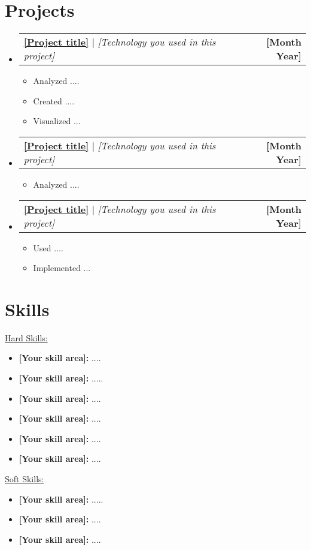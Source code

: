 \documentclass[letterpaper,11pt]{article}
\makeatletter
\newcommand{\resumeItem}[1]{
  \item\small{
    {#1 \vspace{-2pt}}
  }
}
\newcommand{\resumeProjectHeading}[2]{
    \item
    \begin{tabular*}{1.001\textwidth}{l@{\extracolsep{\fill}}r}
      \small#1 & \textbf{\small #2}\\
    \end{tabular*}\vspace{-7pt}
}
\newcommand{\resumeSubHeadingListStart}{\begin{itemize}[leftmargin=0.0in, label={}]}
\newcommand{\resumeSubHeadingListEnd}{\end{itemize}}
\newcommand{\resumeItemListStart}{\begin{itemize}}
\newcommand{\resumeItemListEnd}{\end{itemize}\vspace{-5pt}}
\makeatother
\begin{document}
\section{Projects}
    \vspace{-5pt}
    \resumeSubHeadingListStart
      \resumeProjectHeading
          {\href{[Github link, about your project]}{\textbf{[Project title]}} $|$ \emph{[Technology you used in this project]}}{[Month Year]}
          \resumeItemListStart
            \resumeItem{Analyzed ....}
            \resumeItem{Created ....}
            \resumeItem{Visualized ...}
          \resumeItemListEnd
          \vspace{-13pt}
      \resumeProjectHeading
          {\href{[Github link, about your project]}{\textbf{[Project title]}} $|$ \emph{[Technology you used in this project]}}{[Month Year]}
          \resumeItemListStart
            \resumeItem{Analyzed ....}
          \resumeItemListEnd 
          \vspace{-13pt}
          \resumeProjectHeading
          {\href{[Github link, about your project]}{\textbf{[Project title]}} $|$ \emph{[Technology you used in this project]}}{[Month Year]}
          \resumeItemListStart
            \resumeItem{Used ....}
            \resumeItem{Implemented ...}
          \resumeItemListEnd 
    \resumeSubHeadingListEnd
\vspace{-15pt}

\section{Skills}
 \begin{itemize}[leftmargin=0.01in, label={}]
    \small{\item{
     \underline{Hard Skills:}
        \resumeItemListStart
            \resumeItem{\textbf{[Your skill area]:} ....}
            \resumeItem{\textbf{[Your skill area]:} .....}
            \resumeItem{\textbf{[Your skill area]:} ....}
            \resumeItem{\textbf{[Your skill area]:} ....}
            \resumeItem{\textbf{[Your skill area]:} ....}
            \resumeItem{\textbf{[Your skill area]:} ....}
        \resumeItemListEnd
     \underline{{Soft Skills:}}
        \resumeItemListStart
            \resumeItem{\textbf{[Your skill area]:} .....}
            \resumeItem{\textbf{[Your skill area]:} ....}
            \resumeItem{\textbf{[Your skill area]:} ....}
        \resumeItemListEnd
    }}
 \end{itemize}
\vspace{-16pt}
\end{document}
